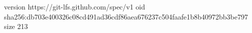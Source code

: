 version https://git-lfs.github.com/spec/v1
oid sha256:db703e400326c08cd491ad36cdf86aea676237c504faafe1b8b40972bb3be797
size 213
